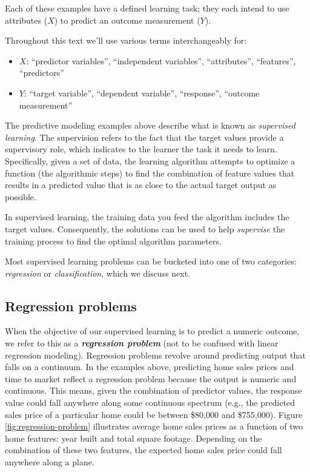 \documentclass[]{krantz}
\makeatletter
\providecommand{\tightlist}{%
  \setlength{\itemsep}{0pt}\setlength{\parskip}{0pt}}
\newenvironment{kframe}{%
\medskip{}
\setlength{\fboxsep}{.8em}
 \def\at@end@of@kframe{}%
 \ifinner\ifhmode%
  \def\at@end@of@kframe{\end{minipage}}%
  \begin{minipage}{\columnwidth}%
 \fi\fi%
 \def\FrameCommand##1{\hskip\@totalleftmargin \hskip-\fboxsep
 \colorbox{shadecolor}{##1}\hskip-\fboxsep
     \hskip-\linewidth \hskip-\@totalleftmargin \hskip\columnwidth}%
 \MakeFramed {\advance\hsize-\width
   \@totalleftmargin\z@ \linewidth\hsize
   \@setminipage}}%
 {\par\unskip\endMakeFramed%
 \at@end@of@kframe}
\newenvironment{block}[1]
  {
  \begin{itemize}
  \renewcommand{\labelitemi}{
    \raisebox{-.7\height}[0pt][0pt]{
      {\setkeys{Gin}{width=3em,keepaspectratio}\texttt{[image: icons/\#1]}}
    }
  }
  \setlength{\fboxsep}{1em}
  \begin{kframe}
  \item
  }
  {
  \end{kframe}
  \end{itemize}
  }
\newenvironment{note}
  {\begin{block}{note}}
  {\end{block}}
\makeatother
\begin{document}
Each of these examples have a defined learning task; they each intend to use attributes (\(X\)) to predict an outcome measurement (\(Y\)).

\begin{note}
Throughout this text we'll use various terms interchangeably for:

\begin{itemize}
\tightlist
\item
  \(X\): ``predictor variables'', ``independent variables'',
  ``attributes'', ``features'', ``predictors''
\item
  \(Y\): ``target variable'', ``dependent variable'', ``response'',
  ``outcome measurement''
\end{itemize}
\end{note}

The predictive modeling examples above describe what is known as \emph{supervised learning}. The supervision refers to the fact that the target values provide a supervisory role, which indicates to the learner the task it needs to learn. Specifically, given a set of data, the learning algorithm attempts to optimize a function (the algorithmic steps) to find the combination of feature values that results in a predicted value that is as close to the actual target output as possible.

\begin{note}
In supervised learning, the training data you feed the algorithm
includes the target values. Consequently, the solutions can be used to
help \emph{supervise} the training process to find the optimal algorithm
parameters.
\end{note}

Most supervised learning problems can be bucketed into one of two categories: \emph{regression} or \emph{classification}, which we discuss next.

\hypertarget{regression-problems}{%
\subsection{Regression problems}\label{regression-problems}}

When the objective of our supervised learning is to predict a numeric outcome, we refer to this as a \textbf{\emph{regression problem}} (not to be confused with linear regression modeling). Regression problems revolve around predicting output that falls on a continuum. In the examples above, predicting home sales prices and time to market reflect a regression problem because the output is numeric and continuous. This means, given the combination of predictor values, the response value could fall anywhere along some continuous spectrum (e.g., the predicted sales price of a particular home could be between \$80,000 and \$755,000). Figure \ref{fig:regression-problem} illustrates average home sales prices as a function of two home features: year built and total square footage. Depending on the combination of these two features, the expected home sales price could fall anywhere along a plane.
\end{document}
